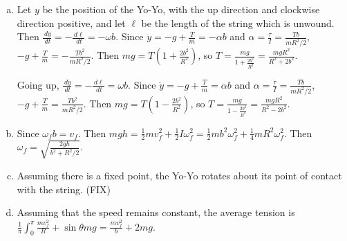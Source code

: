 \documentclass{esg8012pset}
\renewcommand{\d}{\,d}
\begin{document}
\begin{solution}
  \begin{enumerate}[(a)]
    \item Let $y$ be the position of the Yo-Yo, with the up direction and clockwise direction positive, and let $\ell$ be the length of the string which is unwound.  Then $\frac{\d y}{\d t} = -\frac{\d \ell}{\d t} = -\omega b$.  Since $\ddot y = - g + \frac{T}{m} = -\alpha b$ and $\alpha = \frac{\tau}{I} = \frac{T b}{m R^2 / 2}$, $- g + \frac{T}{m} = -\frac{T b^2}{m R^2 / 2}$.  Then $m g = T\left(1 + \frac{2b^2}{R^2}\right)$, so $T = \frac{m g}{1 + \frac{2b^2}{R^2}} = \frac{m g R^2}{R^2 + 2b^2}$. \par
      Going up, $\frac{\d y}{\d t} = -\frac{\d \ell}{\d t} = \omega b$.  Since $\ddot y = -g + \frac{T}{m} = \alpha b$ and $\alpha = \frac{\tau}{I} = \frac{T b}{m R^2 / 2}$, $- g + \frac{T}{m} = \frac{T b^2}{m R^2 / 2}$.  Then $m g = T\left(1 - \frac{2b^2}{R^2}\right)$, so $T = \frac{m g}{1 - \frac{2b^2}{R^2}} = \frac{m g R^2}{R^2 - 2b^2}$.
    \item Since $\omega_f b = v_f$.  Then $m g h = \frac{1}{2} m v_f^2 + \frac{1}{2} I \omega_f^2 = \frac{1}{2} m b^2 \omega_f^2 + \frac{1}{4}mR^2 \omega_f^2$.  Then $\omega_f = \sqrt{\frac{2 g h}{b^2+R^2/2}}$.
    \item Assuming there is a fixed point, the Yo-Yo rotates about its point of contact with the string.  (FIX)
    \item Assuming that the speed remains constant, the average tension is $\frac{1}{\pi}\int_0^\pi \frac{m v_f^2}{R} + \sin\theta m g = \frac{m v_f^2}{b} + 2 m g$.
  \end{enumerate}
\end{solution}
\end{document}
